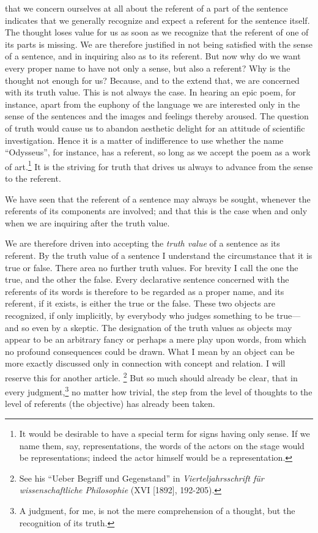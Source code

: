 \documentclass[twoside,12pt]{article}
\newcommand{\footnoteAlph}[2][\thefootnote]{%
  \renewcommand{\thefootnote}{\Alph{footnote}}%
  \footnote[#1]{#2}%
  \renewcommand{\thefootnote}{\arabic{footnote}}}
\begin{document}
that we concern ourselves at all about the referent of a part of the
sentence indicates that we generally recognize and expect a referent
for the sentence itself. The thought loses value for us as soon as we
recognize that the referent of one of its parts is missing. We are
therefore justified in not being satisfied with the sense of a
sentence, and in inquiring also as to its referent. But now why do we
want every proper name to have not only a sense, but also a referent?
Why is the thought not enough for us? Because, and to the extend that,
we are concerned with its truth value. This is not always the case. In
hearing an epic poem, for instance, apart from the euphony of the
language we are interested only in the sense of the sentences and the
images and feelings thereby aroused. The question of truth would cause
us to abandon aesthetic delight for an attitude of scientific
investigation. Hence it is a matter of indifference to use whether the
name ``Odysseus'', for instance, has a referent, so long as we accept
the poem as a work of art.\footnote[6]{It would be desirable to have a
  special term for signs having only sense. If we name them, say,
  representations, the words of the actors on the stage would be
  representations; indeed the actor himself would be a
  representation.} It is the striving for truth that drives us always
to advance from the sense to the referent.

We have seen that the referent of a sentence may always be sought,
whenever the referents of its components are involved; and that this
is the case when and only when we are inquiring after the truth value.

We are therefore driven into accepting the \emph{truth value} of a
sentence as its referent. By the truth value of a sentence I
understand the circumstance that it is true or false. There area no
further truth values. For brevity I call the one the true, and the
other the false. Every declarative sentence concerned with the
referents of its words is therefore to be regarded as a proper name,
and its referent, if it exists, is either the true or the false. These
two objects are recognized, if only implicitly, by everybody who
judges something to be true---and so even by a skeptic. The designation
of the truth values as objects may appear to be an arbitrary fancy or
perhaps a mere play upon words, from which no profound consequences
could be drawn. What I mean by an object can be more exactly discussed
only in connection with concept and relation. I will reserve this for
another article.\footnoteAlph[3]{See his ``Ueber Begriff und
  Gegenstand'' in {\it Vierteljahrsschrift f\"ur wissenschaftliche
    Philosophie} (XVI [1892], 192-205).} But so much should already be
clear, that in every judgment,\footnote[7]{A judgment, for me, is not
  the mere comprehension of a thought, but the recognition of its
  truth.} no matter how trivial, the step from the level of thoughts
to the level of referents (the objective) has already been taken.
\end{document}
